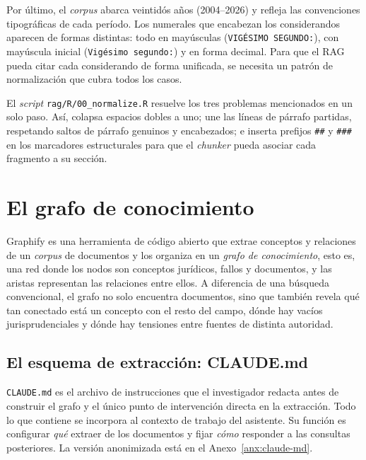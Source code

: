 \documentclass[12pt,a4paper]{article}
\begin{document}
Por último, el \textit{corpus} abarca
veintidós años (2004–2026) y refleja las convenciones tipográficas de cada período.
Los numerales que encabezan los considerandos aparecen de formas distintas: 
todo en mayúsculas (\texttt{VIGÉSIMO SEGUNDO:}), con
mayúscula inicial (\texttt{Vigésimo segundo:}) y en forma decimal. Para que el
RAG pueda citar cada considerando de forma unificada, se necesita un patrón de
normalización que cubra todos los casos.

El \textit{script} \texttt{rag/R/00\_normalize.R} resuelve los tres problemas mencionados en
un solo paso. Así, colapsa espacios dobles a uno; une las líneas de párrafo
partidas, respetando saltos de párrafo genuinos y encabezados; e inserta
prefijos \texttt{\#\#} y \texttt{\#\#\#} en los marcadores estructurales para que
el \textit{chunker} pueda asociar cada fragmento a su sección.

\section{El grafo de conocimiento}
\label{sec:grafo}

Graphify es una herramienta de código abierto que extrae conceptos y relaciones
de un \textit{corpus} de documentos y los organiza en un \emph{grafo de
conocimiento}, esto es, una red donde los nodos son conceptos jurídicos, fallos y
documentos, y las aristas representan las relaciones entre ellos.\autocite{shamsi2025graphify}
A diferencia de una búsqueda convencional, el grafo no solo encuentra documentos, sino que también
revela qué tan conectado está un concepto con el resto del campo, dónde hay vacíos
jurisprudenciales y dónde hay tensiones entre fuentes de distinta autoridad.

\subsection{El esquema de extracción: CLAUDE.md}
\label{sec:claude}

\texttt{CLAUDE.md} es el archivo de instrucciones que el investigador redacta
antes de construir el grafo y el único punto de intervención directa en la
extracción. Todo lo que contiene se incorpora al contexto de trabajo del asistente.
Su función es configurar \emph{qué} extraer de los documentos y fijar
\emph{cómo} responder a las consultas posteriores. La versión
anonimizada está en el Anexo~\ref{anx:claude-md}.
\end{document}
